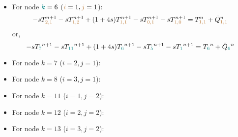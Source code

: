 \begin{itemize}
\item For node ${\color{teal}k}=6$ (${\color{brown}i}=1,{\color{brown}j}=1$):
\[
-s T_{{\color{brown}2,1}}^{n+1}
-s T_{{\color{brown}1,2}}^{n+1} 
+(1+4s)T_{{\color{brown}1,1}}^{n+1} 
-s T_{{\color{brown}0,1}}^{n+1} 
-s T_{{\color{brown}1,0}}^{n+1} 
= T_{{\color{brown}1,1}}^n +\tilde{Q}_{{\color{brown}1,1}}^n
\]
or, 
\[
-s T_{\color{teal} 7}^{n+1}-s T_{\color{teal} 11}^{n+1} +(1+4s)T_{\color{teal} 6}^{n+1} -s T_{\color{teal} 5}^{n+1} -s T_{\color{teal} 1}^{n+1} 
= T_{\color{teal} 6}^n +\tilde{Q}_{\color{teal} 6}^n
\]

\item For node $k=7$ ($i=2,j=1$):
\item For node $k=8$ ($i=3,j=1$):
\item For node $k=11$ ($i=1,j=2$):
\item For node $k=12$ ($i=2,j=2$):
\item For node $k=13$ ($i=3,j=2$):
\end{itemize}



